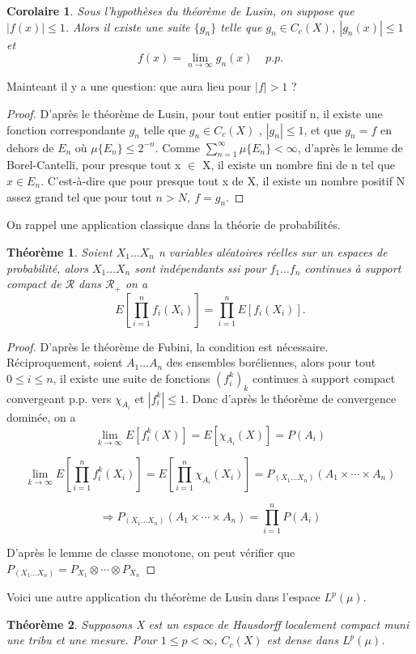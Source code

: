 \documentclass{article}
\newtheorem{theorem}{Théorème}[section]
\newtheorem{corollary}{Corolaire}[theorem]
\begin{document}
\begin{corollary}
Sous l'hypothèses du théorème de Lusin, on suppose que $|f(x)| \leq 1$. Alors il existe une suite $\{g_{n}\}$ telle que $g_{n} \in C_{c}(X)$, $|g_{n}(x)| \leq 1$ et 
\[ f(x) = \lim_{n \rightarrow \infty} g_{n}(x)  \ \ \ \ \ p.p.\]
\end{corollary}

Mainteant il y a une question: que aura lieu pour $|f| >1$ ?

\begin{proof}
D'après le théorème de Lusin, pour tout entier positif n, il existe une fonction correspondante $g_{n}$ telle que $g_{n} \in C_{c}(X)$ ,  $|g_{n}| \leq 1$,  et que $g_{n} = f$ en dehors de $E_{n}$ où $\mu \{E_{n}\} \leq 2^{-n}$. Comme $\sum_{n = 1}^{\infty} \mu\{E_{n}\} < \infty$, d'après le lemme de Borel-Cantelli, pour presque tout x $\in$ X, il existe un nombre fini de n tel que $x\in E_{n}$. C'est-à-dire que pour presque tout x de X, il existe un nombre positif N assez grand tel que pour tout $n > N, \ f = g_{n}$.  
\end{proof}

On rappel une application classique dans la théorie de probabilités.

\begin{theorem}
Soient $X_{1} \dots X_{n}$ n variables aléatoires réelles sur un espaces de probabilité, alors $X_{1} \dots X_{n}$ sont indépendants ssi pour $f_{1}\dots f_{n}$ continues à support compact de $\mathcal{R} $ dans $\mathcal{R}_{+}$ on a 
\[E[\prod_{i=1}^{n}f_{i}(X_{i})] = \prod_{i=1}^{n}E[f_{i}(X_{i})].\]
\end{theorem}

\begin{proof}
D'après le théorème de Fubini, la condition est nécessaire.  
Réciproquement, soient $A_{1} \dots A_{n}$ des ensembles boréliennes, alors pour tout $0 \leq i \leq n$, il existe une suite de fonctions $(f_{i}^{k})_{k}$ continues à support compact convergeant p.p. vers $\chi _{A_{i}}$ et $|f_{i}^{k}| \leq 1$. Donc d'après le théorème de convergence dominée, on a 
\begin{equation}
    \lim_{k \to \infty} E[f_{i}^{k}(X)] = E[\chi_{A_{i}}(X)] = P(A_{i}) 
\end{equation}

\begin{equation}
    \lim_{k \to \infty} E[\prod_{i=1}^{n}f_{i}^{k}(X_{i})] = E[\prod_{i=1}^{n} \chi_{A_{i}}(X_{i})] = P_{(X_{1}\dots X_{n})}(A_{1} \times \cdots \times A_{n}) 
\end{equation}

\par 
\par
   \[ \Longrightarrow  P_{(X_{1}\dots X_{n})}(A_{1} \times \cdots \times A_{n}) = \prod_{i=1}^{n} P(A_{i}) \]

\par
D'après le lemme de classe monotone, on peut vérifier que $P_{(X_{1} \dots X_{n})} = P_{X_{1}}\otimes \cdots \otimes P_{X_{n}} $
\end{proof}

Voici une autre application du théorème de Lusin dans l'espace $L^{p}(\mu)$.

\begin{theorem}
    Supposons X est un espace de Hausdorff localement compact muni une tribu et une mesure. Pour $1 \leq p < \infty$, $C_{c}(X)$ est dense dans $L^{p}(\mu)$.
\end{theorem}
\end{document}
